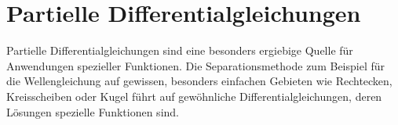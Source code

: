 %
%
%
\chapter{Partielle Differentialgleichungen
\label{buch:chapter:pde}}
\rhead{}
Partielle Differentialgleichungen sind eine besonders ergiebige
Quelle für Anwendungen spezieller Funktionen.
Die Separationsmethode zum Beispiel für die Wellengleichung
auf gewissen, besonders einfachen Gebieten wie Rechtecken,
Kreisscheiben oder Kugel führt auf gewöhnliche Differentialgleichungen,
deren Lösungen spezielle Funktionen sind.







